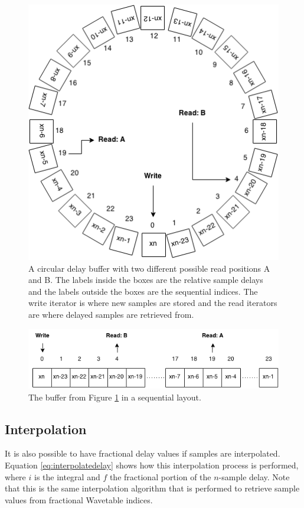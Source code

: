 \documentclass[12pt,twoside]{report}
\begin{document}
\begin{figure}[p!]
  \includegraphics[scale=0.7]{img/ringdelay}
  \caption{A circular delay buffer with two different possible read positions A and B. The labels inside the boxes are the relative sample delays and the labels outside the boxes are the sequential indices. The write iterator is where new samples are stored and the read iterators are where delayed samples are retrieved from.}
  \label{fig:ringdelay}
\end{figure}

\begin{figure}[p!]
  \includegraphics[scale=0.7]{img/seqdelay}
  \caption{The buffer from Figure \ref{fig:ringdelay} in a sequential layout.}
  \label{fig:seqdelay}
\end{figure}

\subsection{Interpolation}

It is also possible to have fractional delay values if samples are interpolated. Equation \ref{eq:interpolatedelay} shows how this interpolation process is performed, where $i$ is the integral and $f$ the fractional portion of the $n$-sample delay. Note that this is the same interpolation algorithm that is performed to retrieve sample values from fractional Wavetable indices.
\end{document}
